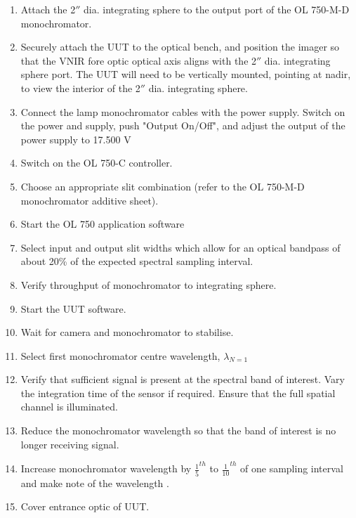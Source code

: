 \documentclass[nohyper,nobib]{tufte-book}
\begin{document}
\begin{enumerate}
	\item Attach the 2$''$ dia. integrating sphere to the output port of the OL 750-M-D monochromator. 
	\item Securely attach the UUT to the optical bench, and position the imager so that the VNIR fore optic optical axis aligns with the 2$''$  dia. integrating sphere port. The UUT will need to be vertically mounted, pointing at nadir, to view the interior of the 2$''$ dia. integrating sphere.
	\item Connect the lamp monochromator cables with the power supply. Switch on the power and supply, push "Output On/Off", and adjust the output of the power supply to 17.500 V
	\item Switch on the OL 750-C controller. 
	\item Choose an appropriate slit combination (refer to the OL 750-M-D monochromator additive sheet). 
	\item Start the OL 750 application software
	\item Select input and output slit widths which allow for an optical bandpass of about 20\% of the expected spectral sampling interval.
	\item Verify throughput of monochromator to integrating sphere.
	\item Start the UUT software.
	\item Wait for camera and monochromator to stabilise. 
	\item Select first monochromator centre wavelength, $\lambda_{N=1}$
	\item Verify that sufficient signal is present at the spectral band of interest. Vary the integration time of the sensor if required. Ensure that the full spatial channel is illuminated. 
	\item Reduce the monochromator wavelength so that the band of interest is no longer receiving signal. 
	\item Increase monochromator wavelength by ${\frac{1}{5}}^{th}$ to ${\frac{1}{10}}^{th}$ of one sampling interval and make note of the wavelength .
	\item Cover entrance optic of UUT.  

\end{enumerate}
\end{document}

